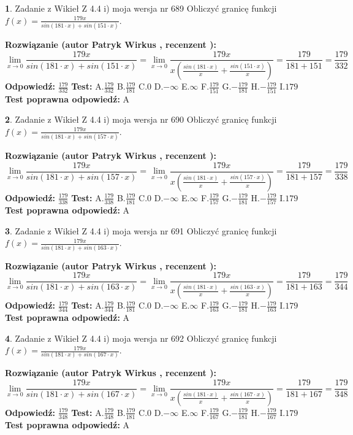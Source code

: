 \documentclass[12pt, a4paper]{article}
\theoremstyle{definition} %
\newtheorem{zad}{}
\newcommand{\zadStart}[1]{\begin{zad}#1\newline}
\newcommand{\zadStop}{\end{zad}}
\newcommand{\rozwStart}[2]{\noindent \textbf{Rozwiązanie (autor #1 , recenzent #2): }\newline}
\newcommand{\rozwStop}{\newline}
\newcommand{\odpStart}{\noindent \textbf{Odpowiedź:}\newline}
\newcommand{\odpStop}{\newline}
\newcommand{\testStart}{\noindent \textbf{Test:}\newline}
\newcommand{\testStop}{\newline}
\newcommand{\kluczStart}{\noindent \textbf{Test poprawna odpowiedź:}\newline}
\newcommand{\kluczStop}{\newline}
\begin{document}
\zadStart{Zadanie z Wikieł Z 4.4 i) moja wersja nr 689}
Obliczyć granicę funkcji $f(x)=\frac{179x}{sin(181\cdot x) +sin(151\cdot x)}$.
\zadStop
\rozwStart{Patryk Wirkus}{}
$$\lim\limits_{x\to 0}\frac{179x}{sin(181\cdot x) +sin(151\cdot x)}=\lim\limits_{x\to 0}\frac{179x}{x(\frac{sin(181\cdot x)}{x}+\frac{sin(151\cdot x)}{x})}=\frac{179}{181+151} = \frac{179}{332}$$
\rozwStop
\odpStart
$\frac{179}{332}$
\odpStop
\testStart
A.$\frac{179}{332}$
B.$\frac{179}{181}$
C.$0$
D.$-\infty$
E.$\infty$
F.$\frac{179}{151}$
G.$-\frac{179}{181}$
H.$-\frac{179}{151}$
I.$179$
\testStop
\kluczStart
A
\kluczStop



\zadStart{Zadanie z Wikieł Z 4.4 i) moja wersja nr 690}
Obliczyć granicę funkcji $f(x)=\frac{179x}{sin(181\cdot x) +sin(157\cdot x)}$.
\zadStop
\rozwStart{Patryk Wirkus}{}
$$\lim\limits_{x\to 0}\frac{179x}{sin(181\cdot x) +sin(157\cdot x)}=\lim\limits_{x\to 0}\frac{179x}{x(\frac{sin(181\cdot x)}{x}+\frac{sin(157\cdot x)}{x})}=\frac{179}{181+157} = \frac{179}{338}$$
\rozwStop
\odpStart
$\frac{179}{338}$
\odpStop
\testStart
A.$\frac{179}{338}$
B.$\frac{179}{181}$
C.$0$
D.$-\infty$
E.$\infty$
F.$\frac{179}{157}$
G.$-\frac{179}{181}$
H.$-\frac{179}{157}$
I.$179$
\testStop
\kluczStart
A
\kluczStop



\zadStart{Zadanie z Wikieł Z 4.4 i) moja wersja nr 691}
Obliczyć granicę funkcji $f(x)=\frac{179x}{sin(181\cdot x) +sin(163\cdot x)}$.
\zadStop
\rozwStart{Patryk Wirkus}{}
$$\lim\limits_{x\to 0}\frac{179x}{sin(181\cdot x) +sin(163\cdot x)}=\lim\limits_{x\to 0}\frac{179x}{x(\frac{sin(181\cdot x)}{x}+\frac{sin(163\cdot x)}{x})}=\frac{179}{181+163} = \frac{179}{344}$$
\rozwStop
\odpStart
$\frac{179}{344}$
\odpStop
\testStart
A.$\frac{179}{344}$
B.$\frac{179}{181}$
C.$0$
D.$-\infty$
E.$\infty$
F.$\frac{179}{163}$
G.$-\frac{179}{181}$
H.$-\frac{179}{163}$
I.$179$
\testStop
\kluczStart
A
\kluczStop



\zadStart{Zadanie z Wikieł Z 4.4 i) moja wersja nr 692}
Obliczyć granicę funkcji $f(x)=\frac{179x}{sin(181\cdot x) +sin(167\cdot x)}$.
\zadStop
\rozwStart{Patryk Wirkus}{}
$$\lim\limits_{x\to 0}\frac{179x}{sin(181\cdot x) +sin(167\cdot x)}=\lim\limits_{x\to 0}\frac{179x}{x(\frac{sin(181\cdot x)}{x}+\frac{sin(167\cdot x)}{x})}=\frac{179}{181+167} = \frac{179}{348}$$
\rozwStop
\odpStart
$\frac{179}{348}$
\odpStop
\testStart
A.$\frac{179}{348}$
B.$\frac{179}{181}$
C.$0$
D.$-\infty$
E.$\infty$
F.$\frac{179}{167}$
G.$-\frac{179}{181}$
H.$-\frac{179}{167}$
I.$179$
\testStop
\kluczStart
A
\kluczStop
\end{document}
